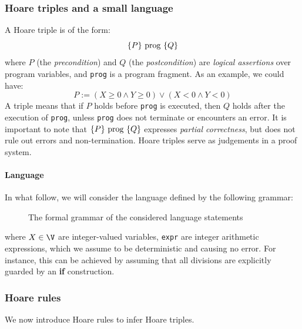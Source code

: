 \documentclass[toc]{../cs-classes/cs-classes}
\begin{document}
\subsubsection{Hoare triples and a small language}
\begin{definition}
    A Hoare triple is of the form:
    \begin{equation*}
        \{P\} \textnormal{ prog } \{Q\}
    \end{equation*}
    where $P$ (the \emph{precondition}) and $Q$ (the \emph{postcondition}) are \emph{logical assertions} over program variables, and \texttt{prog} is a program fragment. As an example, we could have:
    \begin{equation*}
        P := (X \geq 0 \land Y \geq 0) \lor (X<0 \land Y<0)
    \end{equation*}
    A triple means that if $P$ holds before \texttt{prog} is executed, then $Q$ holds after the execution of \texttt{prog}, unless \texttt{prog} does not terminate or encounters an error. It is important to note that $\{P\} \textnormal{ prog } \{Q\}$ expresses \emph{partial correctness}, but does not rule out errors and non-termination. Hoare triples serve as judgements in a proof system.
\end{definition}

\paragraph*{Language}
In what follow, we will consider the language defined by the following grammar:
\begin{figure}[H]
    \centering
    \begin{grammar}
    \end{grammar}
    \caption{The formal grammar of the considered language statements}
\end{figure}
where $X\in\V$ are integer-valued variables, \texttt{expr} are integer arithmetic expressions, which we assume to be deterministic and causing no error. For instance, this can be achieved by assuming that all divisions are explicitly guarded by an \textbf{if} construction.

\subsubsection{Hoare rules}
We now introduce Hoare rules to infer Hoare triples.
\end{document}
